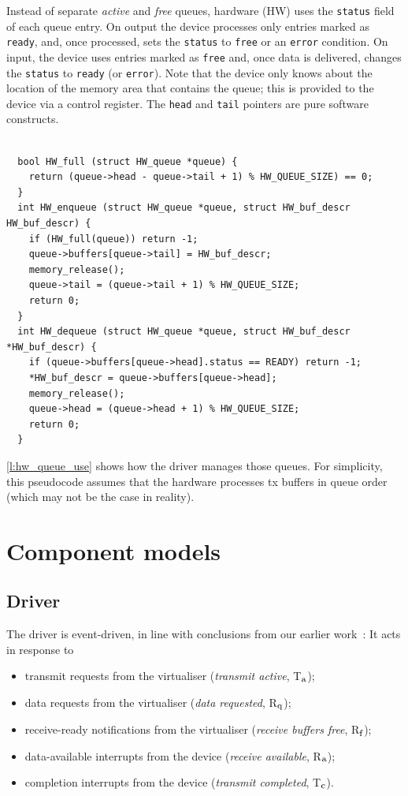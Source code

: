 \documentclass[a4paper,12pt]{report}
\newcommand{\code}[1]{\texttt{#1}}
\newcommand{\Ra}{R\(_{\mbox{\footnotesize a}}\)\xspace}
\newcommand{\Tc}{T\(_{\mbox{\footnotesize c}}\)\xspace}
\newcommand{\Ta}{T\(_{\mbox{\footnotesize a}}\)\xspace}
\newcommand{\Rq}{R\(_{\mbox{\footnotesize q}}\)\xspace}
\newcommand{\Rf}{R\(_{\mbox{\footnotesize f}}\)\xspace}
\begin{document}
Instead of separate \emph{active} and \emph{free} queues, hardware
(HW) uses the \code{status} field of each
queue entry. On output the device processes only entries marked
as \code{ready}, and, once processed, sets the \code{status} to \code{free}
or an \code{error} condition. On input, the device uses entries marked
as \code{free} and, once data is delivered, changes the \code{status} to
\code{ready} (or \code{error}). Note that the device only knows about
the location of the memory area that contains the queue; this is provided to the device via a control
register. The \code{head} and \code{tail} pointers are pure software
constructs.

\begin{lstlisting}[gobble=2,firstline=2,float=ht,tabsize=2,label={l:hw_queue_use},
  caption={Device queue management (simplified).}]

  bool HW_full (struct HW_queue *queue) {
    return (queue->head - queue->tail + 1) % HW_QUEUE_SIZE) == 0;
  }
  int HW_enqueue (struct HW_queue *queue, struct HW_buf_descr HW_buf_descr) {
    if (HW_full(queue)) return -1;
    queue->buffers[queue->tail] = HW_buf_descr;
    memory_release();
    queue->tail = (queue->tail + 1) % HW_QUEUE_SIZE;
    return 0;
  }
  int HW_dequeue (struct HW_queue *queue, struct HW_buf_descr *HW_buf_descr) {
    if (queue->buffers[queue->head].status == READY) return -1;
    *HW_buf_descr = queue->buffers[queue->head];
    memory_release();
    queue->head = (queue->head + 1) % HW_QUEUE_SIZE;
    return 0;
  }
\end{lstlisting}

\autoref{l:hw_queue_use} shows how the driver manages those
queues. For simplicity, this pseudocode assumes that the hardware processes \gls{tx} buffers
in queue order (which may not be the case in reality).

\section{Component models}\label{s:models}

\subsection{Driver}\label{s:model_driver}

The driver is event-driven, in line with conclusions
from our earlier work~\citep{Ryzhyk_CKH_09}: It acts in response to
\begin{itemize}
\item transmit requests from the virtualiser (\emph{transmit active},
  \Ta);
\item data requests from the virtualiser (\emph{data requested}, \Rq);
\item receive-ready notifications from the virtualiser (\emph{receive
    buffers free}, \Rf);
\item data-available interrupts from the device (\emph{receive
    available}, \Ra);
\item completion interrupts from the device (\emph{transmit
    completed}, \Tc).
\end{itemize}
\end{document}
